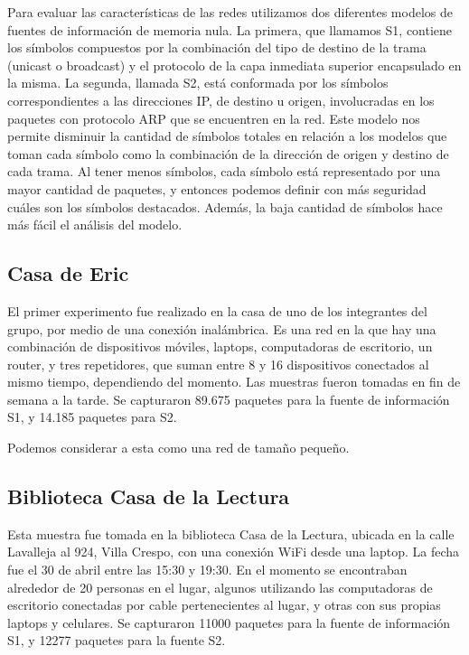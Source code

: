 
Para evaluar las características de las redes utilizamos dos diferentes modelos
de fuentes de información de memoria nula. La primera, que llamamos S1, contiene
los símbolos compuestos por la combinación del tipo de destino de la trama
(unicast o broadcast) y el protocolo de la capa inmediata superior encapsulado
en la misma. La segunda, llamada S2, está conformada por los símbolos 
correspondientes a las direcciones IP, de destino u origen, involucradas en los 
paquetes con protocolo ARP que se encuentren en la red. Este modelo
nos permite disminuir la cantidad de símbolos totales en relación a los
modelos que toman cada símbolo como la combinación de la dirección de 
origen y destino de cada trama. Al tener menos símbolos, cada símbolo
está representado por una mayor cantidad de paquetes, y entonces podemos
definir con más seguridad cuáles son los símbolos destacados. Además,
la baja cantidad de símbolos hace más fácil el análisis del modelo.

\subsection{Casa de Eric}
El primer experimento fue realizado en la casa de uno de los integrantes del grupo, por
medio de una conexión inalámbrica. Es una red en la que hay una combinación de dispositivos
móviles, laptops, computadoras de escritorio, un router, y tres repetidores, 
que suman entre 8 y 16 dispositivos conectados al mismo tiempo, dependiendo del momento.
Las muestras fueron tomadas en fin de semana a la tarde. 
Se capturaron 89.675 paquetes
para la fuente de información S1, y 14.185 paquetes para S2.

Podemos considerar a esta como una red de tamaño pequeño.

\subsection{Biblioteca Casa de la Lectura}
Esta muestra fue tomada en la biblioteca Casa de la Lectura, ubicada en
la calle Lavalleja al 924, Villa Crespo, con una conexión WiFi desde una laptop.
La fecha fue el 30 de abril entre las
15:30 y 19:30. En el momento se encontraban alrededor de 20 personas en el lugar,
algunos utilizando las computadoras de escritorio conectadas por cable
pertenecientes al lugar, y otras con sus propias laptops y celulares. 
Se capturaron 11000 paquetes para la fuente de información S1, 
y 12277 paquetes para la fuente S2.

